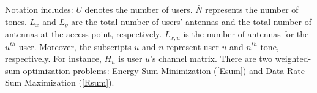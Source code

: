 Notation includes: $U$ denotes the number of users. $\bar{N}$ represents the number of tones. $L_x$ and $L_y$ are the total number of users' antennas and the total number of antennas at the access point, respectively. $L_{x,u}$ is the number of antennas for the $u^{th}$ user. Moreover, the subscripts $u$ and $n$ represent user $u$ and $n^{th}$ tone, respectively. For instance, $H_u$ is user $u$'s channel matrix. 
There are two weighted-sum optimization problems: Energy Sum Minimization (\ref{Esum}) and Data Rate Sum Maximization (\ref{Rsum}).
